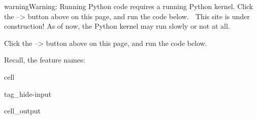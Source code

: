 \documentclass[letterpaper,10pt,english]{jupyterBook}
\begin{document}
\begin{sphinxadmonition}{warning}{Warning:}
\sphinxAtStartPar
Running Python code requires a running Python kernel. Click the  –>  button above on this page, and run the code below. 🚧 This site is under construction! As of now, the Python kernel may run slowly or not at all.👷🏽‍♀️
\end{sphinxadmonition}

\sphinxAtStartPar
Click the  –>  button above on this page, and run the code below.

\sphinxAtStartPar
Recall, the feature names:

\begin{sphinxuseclass}{cell}
\begin{sphinxuseclass}{tag_hide-input}\begin{sphinxVerbatimOutput}

\begin{sphinxuseclass}{cell_output}
\begin{sphinxVerbatim}
\end{sphinxVerbatim}

\end{sphinxuseclass}\end{sphinxVerbatimOutput}

\end{sphinxuseclass}
\end{sphinxuseclass}
\end{document}
